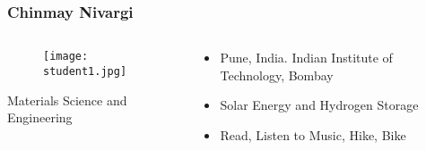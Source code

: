 
	\setbeamertemplate{footline}{\begin{beamercolorbox}[sep=0.5em,wd=\paperwidth,ht=1.35cm,leftskip=0.5cm,rightskip=0.5cm]{footlinecolor}
\parbox{\linewidth}{\centering Engineering}
  	\end{beamercolorbox}%
	}

	\begin{frame}
	\frametitle{\textbf{Chinmay Nivargi}}
	\begin{columns}[T]
	     \begin{column}{0.4\textwidth}
	     \centering
	       \begin{figure}
	\texttt{[image: student1.jpg]}
	       \end{figure}
	      Materials Science and Engineering
	     \end{column}
		\begin{column}{0.5\textwidth}
		\begin{itemize}
		\setlength\itemsep{1em}
		\item Pune, India. Indian Institute of Technology, Bombay
		\item Solar Energy and Hydrogen Storage
		\item Read, Listen to Music, Hike, Bike
		\end{itemize}
		\end{column}
	\end{columns}
	\end{frame}